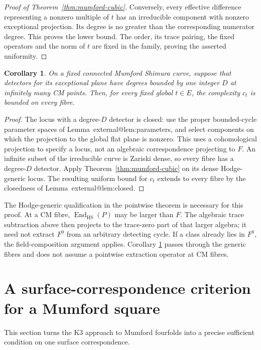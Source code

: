 \documentclass[11pt]{article}
\makeatletter
\providecommand{\compref}[1]{\csname external@#1\endcsname}
\newtheorem{corollary}[theorem]{Corollary}
\theoremstyle{definition}
\theoremstyle{remark}
\makeatother
\begin{document}
\begin{proof}[Proof of Theorem~\ref{thm:mumford-cubic}]
Conversely, every effective difference representing a nonzero
multiple of $t$ has an irreducible component with nonzero
exceptional projection. Its degree is no greater than the
corresponding numerator degree. This proves the lower bound.
The order, its trace pairing, the fixed operators and the norm of
$t$ are fixed in the family, proving the asserted uniformity.
\end{proof}

\begin{corollary}\label{cor:mumford-family}
On a fixed connected Mumford Shimura curve, suppose that detectors
for its exceptional plane have degrees bounded by one integer $D$
at infinitely many CM points. Then, for every fixed global
$t\in E$, the complexity $c_t$ is bounded on every fibre.
\end{corollary}

\begin{proof}
The locus with a degree-$D$ detector is closed: use the proper
bounded-cycle parameter spaces of Lemma~\compref{lem:parameters}, and
select components on which the projection to the global flat plane
is nonzero. This uses a cohomological projection to specify a
locus, not an algebraic correspondence projecting to $F$.
An infinite subset of the irreducible curve is Zariski dense, so
every fibre has a degree-$D$ detector. Apply
Theorem~\ref{thm:mumford-cubic} on its dense Hodge-generic locus.
The resulting uniform bound for $c_t$ extends to every fibre by
the closedness of Lemma~\compref{lem:closed}.
\end{proof}

The Hodge-generic qualification in the pointwise theorem is necessary
for this proof. At a CM fibre,
$\operatorname{End}_{\mathrm{HS}}(P)$ may be larger than $F$.
The algebraic trace subtraction above then projects to the
trace-zero part of that larger algebra; it need not extract $F^0$
from an arbitrary detecting cycle. If a class already lies in
$F^0$, the field-composition argument applies. Corollary
\ref{cor:mumford-family} passes through the generic fibres and does
not assume a pointwise extraction operator at CM fibres.

\section{A surface-correspondence criterion for a Mumford square}
\label{sec:mfg-surface-gate}

This section turns the K3 approach to Mumford fourfolds into a precise sufficient condition on one surface correspondence.
\end{document}
